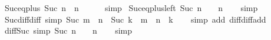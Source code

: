 \begin{isabellebody}
%
\isadelimproof
\isanewline
%
\endisadelimproof
\isanewline
{}\isamarkupfalse%
\ Suc{\isacharunderscore}{\kern0pt}eq{\isacharunderscore}{\kern0pt}plus{}{\isacharcolon}{\kern0pt}\ {\isachardoublequoteopen}Suc\ n\ {\isacharequal}{\kern0pt}\ n\ {\isacharplus}{\kern0pt}\ {}{\isachardoublequoteclose}\isanewline
%
\isadelimproof
\ \ %
\endisadelimproof
%
\isatagproof
{}\isamarkupfalse%
\ simp%
\endisatagproof
{\isafoldproof}%
%
\isadelimproof
\isanewline
%
\endisadelimproof
\isanewline
{}\isamarkupfalse%
\ Suc{\isacharunderscore}{\kern0pt}eq{\isacharunderscore}{\kern0pt}plus{}{\isacharunderscore}{\kern0pt}left{\isacharcolon}{\kern0pt}\ {\isachardoublequoteopen}Suc\ n\ {\isacharequal}{\kern0pt}\ {}\ {\isacharplus}{\kern0pt}\ n{\isachardoublequoteclose}\isanewline
%
\isadelimproof
\ \ %
\endisadelimproof
%
\isatagproof
{}\isamarkupfalse%
\ simp%
\endisatagproof
{\isafoldproof}%
%
\isadelimproof
%
\endisadelimproof
%
\isadelimdocument
%
\endisadelimdocument
%
\isatagdocument
%
\isamarkuptrue%
%
\endisatagdocument
{\isafolddocument}%
%
\isadelimdocument
%
\endisadelimdocument
{}\isamarkupfalse%
\ Suc{\isacharunderscore}{\kern0pt}diff{\isacharunderscore}{\kern0pt}diff\ {\isacharbrackleft}{\kern0pt}simp{\isacharbrackright}{\kern0pt}{\isacharcolon}{\kern0pt}\ {\isachardoublequoteopen}{\isacharparenleft}{\kern0pt}Suc\ m\ {\isacharminus}{\kern0pt}\ n{\isacharparenright}{\kern0pt}\ {\isacharminus}{\kern0pt}\ Suc\ k\ {\isacharequal}{\kern0pt}\ m\ {\isacharminus}{\kern0pt}\ n\ {\isacharminus}{\kern0pt}\ k{\isachardoublequoteclose}\isanewline
%
\isadelimproof
\ \ %
\endisadelimproof
%
\isatagproof
{}\isamarkupfalse%
\ {\isacharparenleft}{\kern0pt}simp\ add{\isacharcolon}{\kern0pt}\ diff{\isacharunderscore}{\kern0pt}diff{\isacharunderscore}{\kern0pt}add{\isacharparenright}{\kern0pt}%
\endisatagproof
{\isafoldproof}%
%
\isadelimproof
\isanewline
%
\endisadelimproof
\isanewline
{}\isamarkupfalse%
\ diff{\isacharunderscore}{\kern0pt}Suc{\isacharunderscore}{\kern0pt}{}\ {\isacharbrackleft}{\kern0pt}simp{\isacharbrackright}{\kern0pt}{\isacharcolon}{\kern0pt}\ {\isachardoublequoteopen}Suc\ n\ {\isacharminus}{\kern0pt}\ {}\ {\isacharequal}{\kern0pt}\ n{\isachardoublequoteclose}\isanewline
%
\isadelimproof
\ \ %
\endisadelimproof
%
\isatagproof
{}\isamarkupfalse%
\ simp%
\endisatagproof
{\isafoldproof}%
%
\isadelimproof
%
\endisadelimproof
%
\isadelimdocument

\end{isabellebody}

